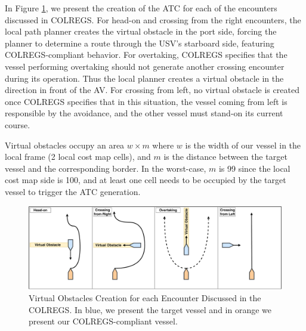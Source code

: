             In Figure \ref{fig:atc}, we present the creation of the \ac{ATC} for each of the encounters discussed in \ac{COLREGS}. For head-on and crossing from the right encounters, the local path planner creates the virtual obstacle in the port side, forcing the planner to determine a route through the \ac{USV}'s starboard side, featuring \ac{COLREGS}-compliant behavior. For overtaking, \ac{COLREGS} specifies that the vessel performing overtaking should not generate another crossing encounter during its operation. Thus the local planner creates a virtual obstacle in the direction in front of the \ac{AV}. For crossing from left, no virtual obstacle is created once \ac{COLREGS} specifies that in this situation, the vessel coming from left is responsible by the avoidance, and the other vessel must stand-on its current course.
            
            Virtual obstacles occupy an area $w \times m$ where $w$ is the width of our vessel in the local frame (2 local cost map cells), and $m$ is the distance between the target vessel and the corresponding border. In the worst-case, $m$ is 99 since the local cost map side is 100, and at least one cell needs to be occupied by the target vessel to trigger the \ac{ATC} generation. 
            
            \begin{figure}[H]
                \centering
                \includegraphics[scale=0.32]{figs/Chap4/atc.pdf}
                \caption{Virtual Obstacles Creation for each Encounter Discussed in the \ac{COLREGS}. In blue, we present the target vessel and in orange we present our COLREGS-compliant vessel.
                }
                \label{fig:atc}
            \end{figure}

